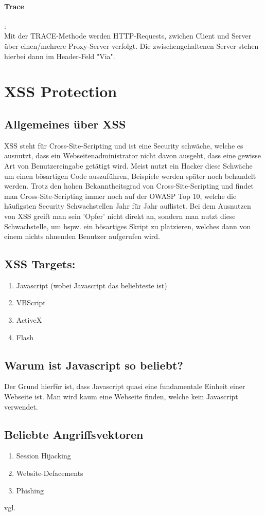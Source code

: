 \paragraph{Trace}:\\Mit der TRACE-Methode werden HTTP-Requests, zwichen Client und Server über einen/mehrere Proxy-Server verfolgt. Die zwischengehaltenen Server stehen hierbei dann im Header-Feld "Via".
\section{XSS Protection}
\label{sec:xss}
\subsection{Allgemeines über XSS}
\label{sec:xss_allgemein}
XSS steht für Cross-Site-Scripting und ist eine Security schwäche, welche es ausnutzt, dass ein Webseitenadministrator nicht davon ausgeht, dass eine gewisse Art von Benutzereingabe getätigt wird. Meist nutzt ein Hacker diese Schwäche um einen bösartigen Code auszuführen, Beispiele werden später noch behandelt werden. Trotz den hohen Bekanntheitsgrad von Cross-Site-Scripting und findet man Cross-Site-Scripting immer noch auf der OWASP Top 10, welche die häufigsten Security Schwachstellen Jahr für Jahr auflistet. Bei dem Ausnutzen von XSS greift man sein 'Opfer' nicht direkt an, sondern man nutzt diese Schwachstelle, um bspw. ein bösartiges Skript zu platzieren, welches dann von einem nichts ahnenden Benutzer aufgerufen wird. 
\subsection{XSS Targets:}
\label{sec:xss_targets}
\begin{enumerate}
\item Javascript (wobei Javascript das beliebteste ist) 
\item VBScript 
\item ActiveX
\item Flash
\end{enumerate}
\subsection{Warum ist Javascript so beliebt?}
\label{sec:xss_why}
Der Grund hierfür ist, dass Javascript quasi eine fundamentale Einheit einer Webseite ist. Man wird kaum eine Webseite finden, welche kein Javascript verwendet.
\subsection{Beliebte Angriffsvektoren}
\label{sec:xss_bel_agg}
\begin{enumerate}
\item Session Hijacking
\item Website-Defacements 
\item Phishing
\end{enumerate}
vgl. \textcite{XSS}
